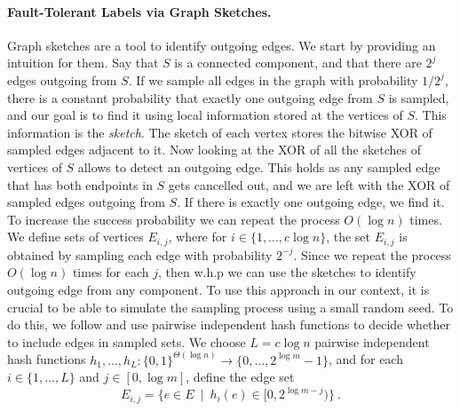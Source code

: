 \paragraph{Fault-Tolerant Labels via Graph Sketches.} 
Graph sketches are a tool to identify outgoing edges. We start by providing an intuition for them. Say that $S$ is a connected component, and that there are $2^j$ edges outgoing from $S$. If we sample all edges in the graph with probability $1/2^j$, there is a constant probability that exactly one outgoing edge from $S$ is sampled, and our goal is to find it using local information stored at the vertices of $S$. This information is the \emph{sketch}. 
The sketch of each vertex stores the bitwise XOR of sampled edges adjacent to it. Now looking at the XOR of all the sketches of vertices of $S$ allows to detect an outgoing edge. This holds as any sampled edge that has both endpoints in $S$ gets cancelled out, and we are left with the XOR of sampled edges outgoing from $S$. If there is exactly one outgoing edge, we find it. To increase the success probability we can repeat the process $O(\log{n})$ times. We define sets of vertices $E_{i,j}$, where for $i \in \{1, \ldots, c \log n\}$, the set $E_{i,j}$ is obtained by sampling each edge with probability $2^{-j}$. Since we repeat the process $O(\log{n})$ times for each $j$, then w.h.p we can use the sketches to identify outgoing edge from any component. To use this approach in our context, it is crucial to be able to simulate the sampling process using a small random seed. To do this, we follow \cite{DuanConnectivityArxiv16,DuanConnectivitySODA17} and use pairwise independent hash functions to decide whether to include edges in sampled sets.
We choose $L=c\log n$ 
pairwise independent hash functions $h_1, \ldots, h_{L}:\{0,1\}^{\Theta(\log n)} \to \{0, \ldots, 2^{\log m}-1\}$, %
and for each $i \in \{1, \ldots, L\}$ and $j \in [0,\log m]$, define the edge set 
$$E_{i,j} =\{ e \in E ~\mid~ h_i(e) \in [0,2^{\log m-j})\}~.$$ 
